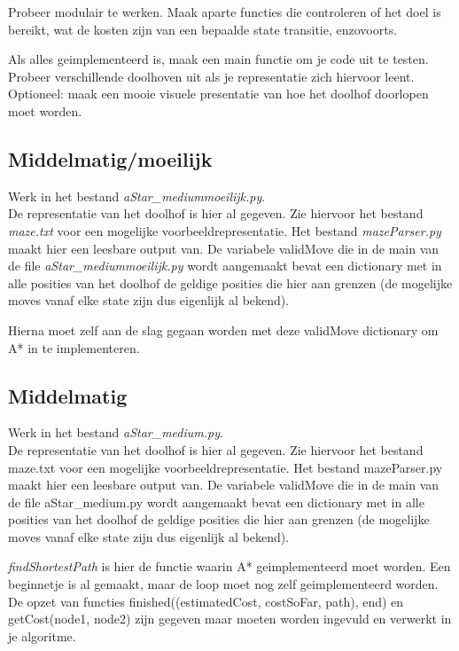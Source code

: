 \documentclass[a4paper]{article}
\begin{document}
Probeer modulair te werken. Maak aparte functies die controleren of het doel is bereikt, wat de kosten
zijn van een bepaalde state transitie, enzovoorts.

Als alles geimplementeerd is, maak een main functie om je code uit te testen. Probeer verschillende doolhoven uit als je representatie zich hiervoor leent.\\
Optioneel: maak een mooie visuele presentatie van hoe het doolhof doorlopen moet worden.


\subsection{Middelmatig/moeilijk}
Werk in het bestand \textit{aStar\_mediummoeilijk.py}.\\
De representatie van het doolhof is hier al gegeven. Zie hiervoor het bestand \textit{maze.txt} voor een mogelijke voorbeeldrepresentatie. Het bestand \textit{mazeParser.py} maakt hier een leesbare output van. De variabele validMove die in de main van de file \textit{aStar\_mediummoeilijk.py} wordt aangemaakt bevat een dictionary met in alle posities van het doolhof de geldige posities die hier aan grenzen (de mogelijke moves vanaf elke state zijn dus eigenlijk al bekend).

Hierna moet zelf aan de slag gegaan worden met deze validMove dictionary om A* in te implementeren. 

\subsection{Middelmatig}
Werk in het bestand \textit{aStar\_medium.py}.\\
De representatie van het doolhof is hier al gegeven. Zie hiervoor het bestand maze.txt voor een mogelijke voorbeeldrepresentatie. 
Het bestand mazeParser.py maakt hier een leesbare output van. De variabele validMove die in de main van de file aStar\_medium.py wordt aangemaakt bevat een dictionary met in alle posities van het doolhof de geldige posities die hier aan grenzen (de
mogelijke moves vanaf elke state zijn dus eigenlijk al bekend).

\textit{findShortestPath} is hier de functie waarin A* geimplementeerd moet worden. Een beginnetje is al gemaakt, maar de loop moet nog zelf geimplementeerd worden. De opzet van functies finished((estimatedCost, costSoFar, path), end) en getCost(node1,
node2) zijn gegeven maar moeten worden ingevuld en verwerkt in je algoritme.
\end{document}
